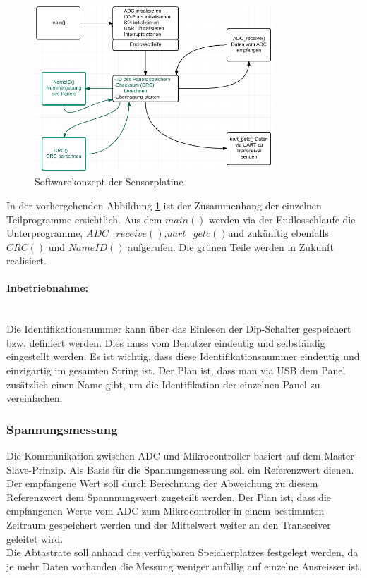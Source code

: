 \begin{figure}[htb]
\centering
\includegraphics[width=0.8\textwidth]{sections/data/Sensorplatine}
\caption{Softwarekonzept der Sensorplatine}
\label{DiagrammSP}
\end{figure}

In der vorhergehenden Abbildung \ref{DiagrammSP} ist der Zusammenhang der einzelnen Teilprogramme ersichtlich. Aus dem $main()$ werden via der Endlosschlaufe die Unterprogramme, $ADC$\_$receive()$,$uart$\_$getc()$und zukünftig ebenfalls $CRC()$ und $NameID()$ aufgerufen. Die grünen Teile werden in Zukunft realisiert.\\

\paragraph{Inbetriebnahme:}\\
Die Identifikationsnummer kann über das Einlesen der Dip-Schalter gespeichert bzw. definiert werden. Dies muss vom Benutzer eindeutig und selbständig eingestellt werden. Es ist wichtig, dass diese Identifikationsnummer eindeutig und einzigartig im gesamten String ist. Der Plan ist, dass man via USB dem Panel zusätzlich einen Name gibt, um die Identifikation der einzelnen Panel zu vereinfachen. 
\newpage
\subsubsection{Spannungsmessung}\label{Spannungsmessung}
Die Kommunikation zwischen ADC und Mikrocontroller basiert auf dem Master-Slave-Prinzip. 
Als Basis für die Spannungsmessung soll ein Referenzwert dienen. Der empfangene Wert soll durch Berechnung der Abweichung zu diesem Referenzwert dem Spannnungswert zugeteilt werden. Der Plan ist, dass die empfangenen Werte vom ADC zum Mikrocontroller in einem bestimmten Zeitraum gespeichert werden und der Mittelwert weiter an den Transceiver geleitet wird.\\ Die Abtastrate soll anhand   des verfügbaren Speicherplatzes festgelegt werden, da je mehr Daten vorhanden die Messung weniger anfällig auf einzelne Ausreisser ist. 

